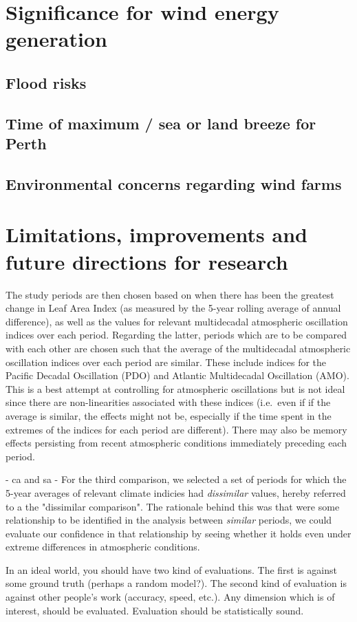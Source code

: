 \section{Significance for wind energy generation}

\subsection{Flood risks}

\subsection{Time of maximum / sea or land breeze for Perth}

\subsection{Environmental concerns regarding wind farms}

\section[Limitations, improvements and future directions]{Limitations, improvements and future directions for research}

The study periods are then chosen based on when there has been the greatest change in Leaf Area Index (as measured by the 5-year rolling average of annual difference), as well as the values for relevant multidecadal atmospheric oscillation indices over each period. Regarding the latter, periods which are to be compared with each other are chosen such that the average of the multidecadal atmospheric oscillation indices over each period are similar. These include indices for the Pacific Decadal Oscillation (PDO) and Atlantic Multidecadal Oscillation (AMO). This is a best attempt at controlling for atmospheric oscillations but is not ideal since there are non-linearities associated with these indices (i.e.\ even if if the average is similar, the effects might not be, especially if the time spent in the extremes of the indices for each period are different). There may also be memory effects persisting from recent atmospheric conditions immediately preceding each period.


- ca and sa
- For the third comparison, we selected a set of periods for which the 5-year averages of relevant climate indicies had \textit{dissimilar} values, hereby referred to a the "dissimilar comparison". The rationale behind this was that were some relationship to be identified in the analysis between \textit{similar} periods, we could evaluate our confidence in that relationship by seeing whether it holds even under extreme differences in atmospheric conditions.

In an ideal world, you should have two kind of evaluations. The first is against some ground truth (perhaps a random model?). The second kind of evaluation is against other people's work (accuracy, speed, etc.). Any dimension which is of interest, should be evaluated.  Evaluation should be statistically sound.